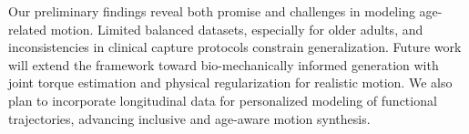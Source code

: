 Our preliminary findings reveal both promise and challenges in modeling age-related motion. Limited balanced datasets, especially for older adults, and inconsistencies in clinical capture protocols constrain generalization. Future work will extend the framework toward bio-mechanically informed generation with joint torque estimation and physical regularization for realistic motion. We also plan to incorporate longitudinal data for personalized modeling of functional trajectories, advancing inclusive and age-aware motion synthesis.